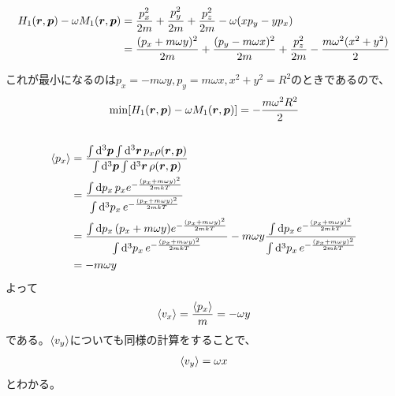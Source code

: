 \documentclass[../ap_2023.tex]{subfiles}
\begin{document}
\section{}
\subsection{}
\begin{equation}\begin{aligned}[b]
    H_1(\vb*{r},\vb*{p})-\omega M_1(\vb*{r},\vb*{p})
    &= \frac{p_x^2}{2m}+\frac{p_y^2}{2m}+\frac{p_z^2}{2m}-\omega(xp_y-yp_x)\\
    &= \frac{(p_x+m\omega y)^2}{2m}+\frac{(p_y-m\omega x)^2}{2m}+\frac{p_z^2}{2m}-\frac{m\omega^2(x^2+y^2)}{2}\\
\end{aligned}\end{equation}
これが最小になるのは\(p_x=-m\omega y,p_y=m\omega x, x^2+y^2=R^2\)のときであるので、
\begin{equation}\begin{aligned}[b]
    \min [H_1(\vb*{r},\vb*{p})-\omega M_1(\vb*{r},\vb*{p})] = -\frac{m\omega^2R^2}{2}
\end{aligned}\end{equation}

\subsection{}
\begin{equation}\begin{aligned}[b]
    \ev{p_x} &= \frac{\int\dd[3]{\vb*{p}}\int\dd[3]{\vb*{r}}p_x\rho(\vb*{r},\vb*{p})}{\int\dd[3]{\vb*{p}}\int\dd[3]{\vb*{r}}\rho(\vb*{r},\vb*{p})}\\
    &=\frac{\int\dd{p_x}p_xe^{-\frac{(p_x+m\omega y)^2}{2mkT}}}{\int\dd[3]{p_x}e^{-\frac{(p_x+m\omega y)^2}{2mkT}}}\\
    &=\frac{\int\dd{p_x}(p_x+m\omega y)e^{-\frac{(p_x+m\omega y)^2}{2mkT}}}{\int\dd[3]{p_x}e^{-\frac{(p_x+m\omega y)^2}{2mkT}}}
    -m\omega y\frac{\int\dd{p_x}e^{-\frac{(p_x+m\omega y)^2}{2mkT}}}{\int\dd[3]{p_x}e^{-\frac{(p_x+m\omega y)^2}{2mkT}}}\\
    &= -m\omega y
\end{aligned}\end{equation}
よって
\begin{equation}\begin{aligned}[b]
    \ev{v_x} = \frac{\ev{p_x}}{m} = -\omega y
\end{aligned}\end{equation}
である。\(\ev{v_y}\)についても同様の計算をすることで、
\begin{equation}\begin{aligned}[b]
    \ev{v_y} = \omega x
\end{aligned}\end{equation}
とわかる。
\end{document}
